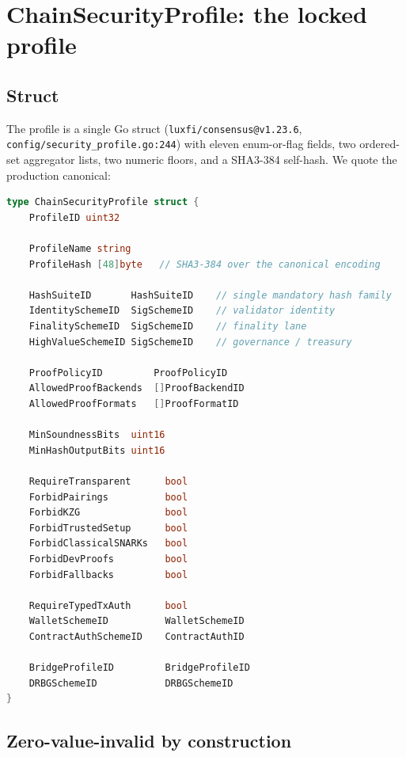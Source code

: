 \section{ChainSecurityProfile: the locked profile}
\label{sec:profile}

\subsection{Struct}

The profile is a single Go struct (\texttt{luxfi/consensus@v1.23.6},
\texttt{config/security\_profile.go:244}) with eleven enum-or-flag fields, two
ordered-set aggregator lists, two numeric floors, and a SHA3-384 self-hash. We
quote the production canonical:

\begin{lstlisting}[language=Go,caption={ChainSecurityProfile fields.
\texttt{luxfi/consensus@v1.23.6}, \texttt{config/security\_profile.go:244}.
Comments shortened for the paper; canonical comments live with the source.}]
type ChainSecurityProfile struct {
    ProfileID uint32

    ProfileName string
    ProfileHash [48]byte   // SHA3-384 over the canonical encoding

    HashSuiteID       HashSuiteID    // single mandatory hash family
    IdentitySchemeID  SigSchemeID    // validator identity
    FinalitySchemeID  SigSchemeID    // finality lane
    HighValueSchemeID SigSchemeID    // governance / treasury

    ProofPolicyID         ProofPolicyID
    AllowedProofBackends  []ProofBackendID
    AllowedProofFormats   []ProofFormatID

    MinSoundnessBits  uint16
    MinHashOutputBits uint16

    RequireTransparent      bool
    ForbidPairings          bool
    ForbidKZG               bool
    ForbidTrustedSetup      bool
    ForbidClassicalSNARKs   bool
    ForbidDevProofs         bool
    ForbidFallbacks         bool

    RequireTypedTxAuth      bool
    WalletSchemeID          WalletSchemeID
    ContractAuthSchemeID    ContractAuthID

    BridgeProfileID         BridgeProfileID
    DRBGSchemeID            DRBGSchemeID
}
\end{lstlisting}

\subsection{Zero-value-invalid by construction}


